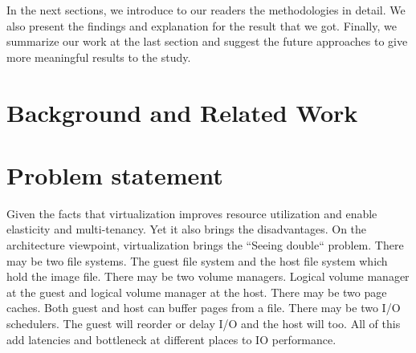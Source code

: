 \documentclass{acmsig}
\begin{document}
In the next sections, we introduce to our readers the methodologies in detail. We also present the findings and explanation for the result that we got. Finally, we summarize our work at the last section and suggest the future approaches to give more meaningful results to the study.

\section{Background and Related Work}



%



\section{Problem statement}

Given the facts that virtualization improves resource utilization and enable elasticity and multi-tenancy. Yet it also brings the disadvantages. On the architecture viewpoint, virtualization brings the ``Seeing double`` problem. There may be two file systems. The guest file system and the host file system which hold the image file. There may be two volume managers. Logical volume manager at the guest and logical volume manager at the host. There may be two page caches. Both guest and host can buffer pages from a file. There may be two I/O schedulers. The guest will reorder or delay I/O and the host will too. All of this add latencies and bottleneck at different places to IO performance.
\end{document}
